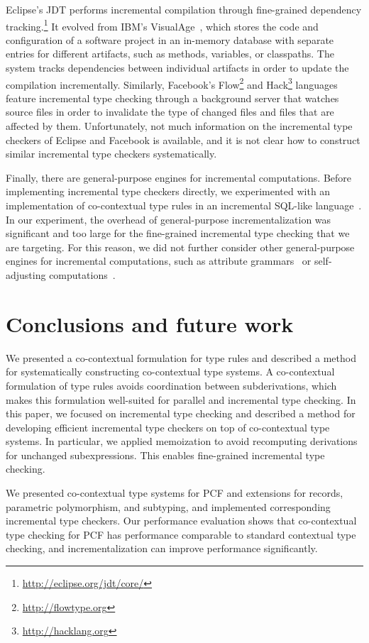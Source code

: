 \documentclass{llncs}
\begin{document}
Eclipse's JDT performs incremental compilation through fine-grained dependency
tracking.\footnote{\url{http://eclipse.org/jdt/core/}} It evolved from IBM's
VisualAge~\cite{ChamberlandLR98}, which stores the code and configuration of a
software project in an in-memory database with separate entries for different
artifacts, such as methods, variables, or classpaths. The system tracks
dependencies between individual artifacts in order to update the compilation
incrementally. Similarly, Facebook's Flow\footnote{\url{http://flowtype.org}}
and Hack\footnote{\url{http://hacklang.org}} languages feature incremental type
checking through a background server that watches source files in order to
invalidate the type of changed files and files that are affected by them.
Unfortunately, not much information on the incremental type checkers of Eclipse
and Facebook is available, and it is not clear how to construct similar
incremental type checkers systematically.

Finally, there are general-purpose engines for incremental computations. Before
implementing incremental type checkers directly, we experimented with an
implementation of co-contextual type rules in an incremental SQL-like
language~\cite{MitschkeEKMS14}. In our experiment, the overhead of
general-purpose incrementalization was significant and too large for the
fine-grained incremental type checking that we are targeting. For this reason,
we did not further consider other general-purpose engines for incremental
computations, such as attribute grammars~\cite{DemersRT81} or self-adjusting
computations~\cite{AcarBBHT09}.


\section{Conclusions and future work}

We presented a co-contextual formulation for type rules and described a method
for systematically constructing co-contextual type systems. A co-contextual
formulation of type rules avoids coordination between subderivations, which
makes this formulation well-suited for parallel and incremental type
checking. In this paper, we focused on incremental type checking and described a
method for developing efficient incremental type checkers on top of
co-contextual type systems. In particular, we applied memoization to avoid
recomputing derivations for unchanged subexpressions. This enables fine-grained
incremental type checking.

We presented co-contextual type systems for PCF and extensions for records,
parametric polymorphism, and subtyping, and implemented corresponding
incremental type checkers. Our performance evaluation shows that co-contextual
type checking for PCF has performance comparable to standard contextual type
checking, and incrementalization can improve performance significantly.
\end{document}
